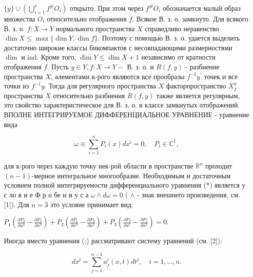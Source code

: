\documentclass[10pt]{article}
\begin{document}
$\{y\} \cup\left(\bigcup_{i=1}^{s} f^{\#} O_{i}\right)$ открыто. При этом через $f^{\#} O_{i}$ обозначается малый образ множества $O_{i}$ относительно отображения $f$. Всякое В. з. о. замкнуто. Для всякого В. з. о. $f: X \rightarrow Y$ нормального пространства $X$ справедливо неравенство $\operatorname{dim} X \leqslant \max \{\operatorname{dim} Y, \operatorname{dim} f\}$. Поэтому с помощью В. з. о. удается выделить достаточно широкие классы бикомпактов с несовпадающими размерностями $\operatorname{dim}$ и ind. Кроме того, $\operatorname{dim} Y \leqslant \operatorname{dim} X+1$ независимо от кратности отображения $f$. Пусть $y \in Y, f: X \rightarrow Y-$ В. з. о. и $R(f, y)$ - разбиение пространства $X$, әлементами к-рого являются все прообразы $f^{-1} y^{\prime}$ точек и все точки из $f^{-1} y$. Тогда для регулярного пространства $X$ факторпространство $X_{f}^{y}$ пространства $X$ относительно разбиения $R(f, y)$ также является регулярным, это свойство характеристическое для В. з. о. в классе замкнутых отображений. ВПОЛНЕ ИНТЕГРИРУЕМОЕ ДИФФЕРЕНЦИАЛЬНОЕ УРАВНЕНИЕ - уравнение вида



\[

\omega \equiv \sum_{i=1}^{n} P_{i}(x) d x^{i}=0, \quad P_{i} \in \mathbb{C}^{1},

\]



для к-рого через каждую точку нек-рой области в пространстве $\mathbb{R}^{n}$ проходит $(n-1)$-мерное интегральное многообразие. Необходимым и достаточным условием полной интегрируемости дифференциального уравнения (*) является у с ло в и е Ф р о бе н и у с а $\omega \wedge d \omega=0$ ( $\wedge$ - знак внешнего произведения, см. [1]). Для $n=3$ это условие принимает вид:



$P_{1}\left(\frac{\partial P_{3}}{\partial x^{2}}-\frac{\partial P_{2}}{\partial x^{3}}\right)+P_{2}\left(\frac{\partial P_{1}}{\partial x^{3}}-\frac{\partial P_{3}}{\partial x^{1}}\right)+P_{3}\left(\frac{\partial P_{2}}{\partial x^{1}}-\frac{\partial P_{1}}{\partial x^{2}}\right)=0$.



Иногда вместо уравнения (;) рассматривают систему уравнений (см. [2]):



\[

d x^{l}=\sum_{j=1}^{n-1} a_{j}^{i}(x, t) d t^{j}, \quad i=1, \ldots, n .

\]
\end{document}
